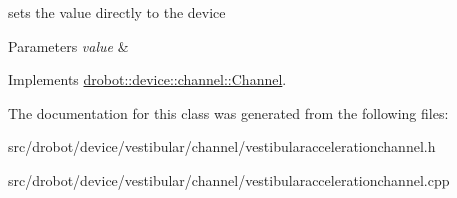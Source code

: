 sets the value directly to the device 


\begin{DoxyParams}{Parameters}
{\em value} & \\
\hline
\end{DoxyParams}


Implements \hyperlink{classdrobot_1_1device_1_1channel_1_1Channel_a612a3f6afe59e238583d6d40d9ddcaf8}{drobot\-::device\-::channel\-::\-Channel}.



The documentation for this class was generated from the following files\-:\begin{DoxyCompactItemize}
\item 
src/drobot/device/vestibular/channel/vestibularaccelerationchannel.\-h\item 
src/drobot/device/vestibular/channel/vestibularaccelerationchannel.\-cpp\end{DoxyCompactItemize}

